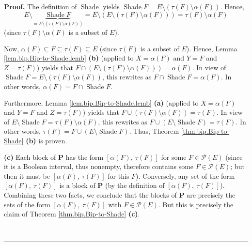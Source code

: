 \documentclass[numbers=enddot,12pt,final,onecolumn]{scrartcl}%
\theoremstyle{definition}
\newenvironment{proof}[1][Proof]{\noindent\textbf{#1.} }{\ \rule{0.5em}{0.5em}}
\newenvironment{vershort}{}{}
\begin{document}
\begin{proof}
The definition of $\operatorname*{Shade}$ yields $\operatorname*{Shade}%
F=E\setminus\left(  \tau\left(  F\right)  \setminus\alpha\left(  F\right)
\right)  $. Hence,
\[
E\setminus\underbrace{\operatorname*{Shade}F}_{=E\setminus\left(  \tau\left(
F\right)  \setminus\alpha\left(  F\right)  \right)  }=E\setminus\left(
E\setminus\left(  \tau\left(  F\right)  \setminus\alpha\left(  F\right)
\right)  \right)  =\tau\left(  F\right)  \setminus\alpha\left(  F\right)
\]
(since $\tau\left(  F\right)  \setminus\alpha\left(  F\right)  $ is a subset
of $E$).

Now, $\alpha\left(  F\right)  \subseteq F\subseteq\tau\left(  F\right)
\subseteq E$ (since $\tau\left(  F\right)  $ is a subset of $E$). Hence, Lemma
\ref{lem.bip.Bip-to-Shade.lemb} \textbf{(b)} (applied to $X=\alpha\left(
F\right)  $ and $Y=F$ and $Z=\tau\left(  F\right)  $) yields that
$F\cap\left(  E\setminus\left(  \tau\left(  F\right)  \setminus\alpha\left(
F\right)  \right)  \right)  =\alpha\left(  F\right)  $. In view of
$\operatorname*{Shade}F=E\setminus\left(  \tau\left(  F\right)  \setminus
\alpha\left(  F\right)  \right)  $, this rewrites as $F\cap
\operatorname*{Shade}F=\alpha\left(  F\right)  $. In other words,
$\alpha\left(  F\right)  =F\cap\operatorname*{Shade}F$.

Furthermore, Lemma \ref{lem.bip.Bip-to-Shade.lemb} \textbf{(a)} (applied to
$X=\alpha\left(  F\right)  $ and $Y=F$ and $Z=\tau\left(  F\right)  $) yields
that $F\cup\left(  \tau\left(  F\right)  \setminus\alpha\left(  F\right)
\right)  =\tau\left(  F\right)  $. In view of $E\setminus\operatorname*{Shade}%
F=\tau\left(  F\right)  \setminus\alpha\left(  F\right)  $, this rewrites as
$F\cup\left(  E\setminus\operatorname*{Shade}F\right)  =\tau\left(  F\right)
$. In other words, $\tau\left(  F\right)  =F\cup\left(  E\setminus
\operatorname*{Shade}F\right)  $. Thus, Theorem \ref{thm.bip.Bip-to-Shade}
\textbf{(b)} is proven.

\begin{vershort}
\textbf{(c)} Each block of $\mathbf{P}$ has the form $\left[  \alpha\left(
F\right)  ,\ \tau\left(  F\right)  \right]  $ for some $F\in\mathcal{P}\left(
E\right)  $ (since it is a Boolean interval, thus nonempty, therefore contains
some $F\in\mathcal{P}\left(  E\right)  $; but then it must be $\left[
\alpha\left(  F\right)  ,\ \tau\left(  F\right)  \right]  $ for this $F$).
Conversely, any set of the form $\left[  \alpha\left(  F\right)
,\ \tau\left(  F\right)  \right]  $ is a block of $\mathbf{P}$ (by the
definition of $\left[  \alpha\left(  F\right)  ,\ \tau\left(  F\right)
\right]  $). Combining these two facts, we conclude that the blocks of
$\mathbf{P}$ are precisely the sets of the form $\left[  \alpha\left(
F\right)  ,\ \tau\left(  F\right)  \right]  $ with $F\in\mathcal{P}\left(
E\right)  $. But this is precisely the claim of Theorem
\ref{thm.bip.Bip-to-Shade} \textbf{(c)}. \qedhere


\end{vershort}
\end{proof}
\end{document}

